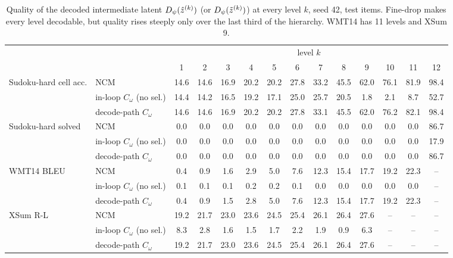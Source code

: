 \begin{table}[t]
\centering
\caption{Quality of the decoded intermediate latent $D_\psi(\hat{z}^{(k)})$ (or $D_\psi(\tilde{z}^{(k)})$) at every level $k$, seed 42, test items. Fine-drop makes every level decodable, but quality rises steeply only over the last third of the hierarchy. WMT14 has 11 levels and XSum 9.}
\label{tab:levels}
\setlength{\tabcolsep}{2.6pt}
\begin{tabular}{llcccccccccccc}
\toprule
 & & \multicolumn{12}{c}{level $k$}\\
 & & 1 & 2 & 3 & 4 & 5 & 6 & 7 & 8 & 9 & 10 & 11 & 12\\
\midrule
Sudoku-hard cell acc. & NCM & 14.6 & 14.6 & 16.9 & 20.2 & 20.2 & 27.8 & 33.2 & 45.5 & 62.0 & 76.1 & 81.9 & 98.4\\
 & in-loop $C_\omega$ (no sel.) & 14.4 & 14.2 & 16.5 & 19.2 & 17.1 & 25.0 & 25.7 & 20.5 & 1.8 & 2.1 & 8.7 & 52.7\\
 & decode-path $C_\omega$ & 14.6 & 14.6 & 16.9 & 20.2 & 20.2 & 27.8 & 33.1 & 45.5 & 62.0 & 76.2 & 82.1 & 98.4\\
\midrule
Sudoku-hard solved & NCM & 0.0 & 0.0 & 0.0 & 0.0 & 0.0 & 0.0 & 0.0 & 0.0 & 0.0 & 0.0 & 0.0 & 86.7\\
 & in-loop $C_\omega$ (no sel.) & 0.0 & 0.0 & 0.0 & 0.0 & 0.0 & 0.0 & 0.0 & 0.0 & 0.0 & 0.0 & 0.0 & 17.9\\
 & decode-path $C_\omega$ & 0.0 & 0.0 & 0.0 & 0.0 & 0.0 & 0.0 & 0.0 & 0.0 & 0.0 & 0.0 & 0.0 & 86.7\\
\midrule
WMT14 BLEU & NCM & 0.4 & 0.9 & 1.6 & 2.9 & 5.0 & 7.6 & 12.3 & 15.4 & 17.7 & 19.2 & 22.3 & --\\
 & in-loop $C_\omega$ (no sel.) & 0.1 & 0.1 & 0.1 & 0.2 & 0.2 & 0.1 & 0.0 & 0.0 & 0.0 & 0.0 & 0.0 & --\\
 & decode-path $C_\omega$ & 0.4 & 0.9 & 1.5 & 2.8 & 5.0 & 7.6 & 12.3 & 15.4 & 17.7 & 19.2 & 22.3 & --\\
\midrule
XSum R-L & NCM & 19.2 & 21.7 & 23.0 & 23.6 & 24.5 & 25.4 & 26.1 & 26.4 & 27.6 & -- & -- & --\\
 & in-loop $C_\omega$ (no sel.) & 8.3 & 2.8 & 1.6 & 1.5 & 1.7 & 2.2 & 1.9 & 0.9 & 6.3 & -- & -- & --\\
 & decode-path $C_\omega$ & 19.2 & 21.7 & 23.0 & 23.6 & 24.5 & 25.4 & 26.1 & 26.4 & 27.6 & -- & -- & --\\
\bottomrule
\end{tabular}
\end{table}
